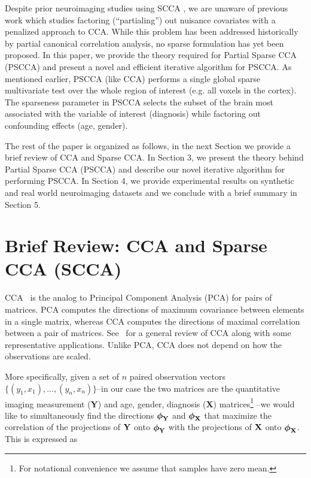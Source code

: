 \documentclass{llncs}
\newcommand{\X}{{\bf X}}
\newcommand{\Y}{{\bf Y}}
\newcommand{\bs}{\boldsymbol}
\begin{document}
Despite prior neuroimaging studies using SCCA \cite{Avants2010b}, we
are unaware of previous work which studies factoring (``partialing'')
out nuisance covariates with a penalized approach to CCA.  While this
problem has been addressed historically by partial canonical
correlation analysis\cite{timm}, no sparse formulation has yet been
proposed.  In this paper, we provide the theory required for Partial Sparse CCA
(PSCCA) and present a novel and efficient iterative algorithm for
PSCCA. As mentioned earlier, PSCCA (like CCA) performs a single global
sparse multivariate test over the whole region of interest (e.g. all
voxels in the cortex). The sparseness parameter in PSCCA selects the
subset of the brain most associated with the variable of interest
(diagnosis) while factoring out confounding effects (age, gender).

The rest of the paper is organized as follows, in the next Section we
provide a brief review of CCA and Sparse CCA. In Section 3, we present
the theory behind Partial Sparse CCA (PSCCA) and describe our novel
iterative algorithm for performing PSCCA. In Section 4, we provide
experimental results on synthetic and real world neuroimaging datasets
and we conclude with a brief summary in Section 5.




\section{Brief Review: CCA and Sparse CCA (SCCA)}

CCA~\cite{hotellingcca} is the analog to Principal
Component Analysis (PCA) for pairs of matrices. PCA
computes the directions of maximum covariance between elements in a
single matrix, whereas CCA computes the directions of maximal correlation
between a pair of matrices. 
See~\cite{taylor:cca} for a general review of CCA along with some representative applications. 
Unlike PCA, CCA does not depend on how the observations
are scaled.  

More specifically, given a set of $n$ paired observation vectors
$\{(y_1,x_1),...,(y_n,x_n)\}$--in our case the two matrices are the
quantitative imaging measurement ({\Y}) and age, gender, diagnosis ({\X}) matrices\footnote{For
  notational convenience we assume that samples have zero mean.} --we would like to simultaneously find the directions
${\bs{\bs\phi_{\Y}}}$ and
${\bs{\bs\phi_{\X}}}$ that maximize the correlation of
the projections of ${\Y}$ onto ${\bs{\bs\phi_{\Y}}}$
with the projections of ${\X}$ onto
${\bs{\bs\phi_{\X}}}$. This is expressed as
\end{document}
